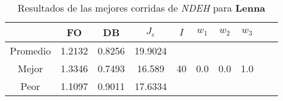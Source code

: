 \begin{table}[h!]
\footnotesize
\begin{center}
\begin{tabular}{|c|c|c|c|c|c|c|c|c|c|}
\hline
& {\bf FO} & {\bf DB}& $J_e$ & $I$ & $w_1$ & $w_2$ & $w_3$ \\
\hline
\hline
Promedio   & 1.2132 & 0.8256  & 19.9024 &  &  &  & \\
\cline{1-4}
Mejor & 1.3346 & 0.7493  & 16.589 & 40 & 0.0 & 0.0 & 1.0\\
\cline{1-4}
Peor & 1.1097 & 0.9011  & 17.6334 &  &  &  & \\\hline
\end{tabular}
\caption{Resultados de las mejores corridas de \emph{NDEH} para {\bf Lenna}}
\label{tb:pmpdehibimg}
\end{center}
\end{table}
